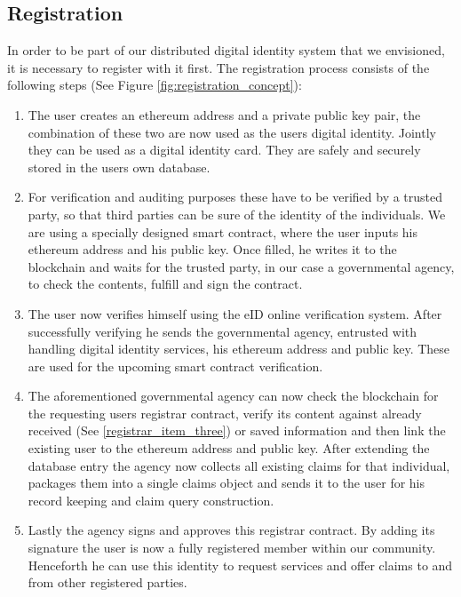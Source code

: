 \subsection{Registration}
In order to be part of our distributed digital identity system that we envisioned, it is necessary to register with it first. The registration process consists of the following steps (See Figure \ref{fig:registration_concept}):

\begin{enumerate}
\item \label{registrar_item_one}
The user creates an ethereum address and a private public key pair, the combination of these two are now used as the users digital identity. Jointly they can be used as a digital identity card. They are safely and securely stored in the users own database.
\item \label{registrar_item_two}
For verification and auditing purposes these have to be verified by a trusted party, so that third parties can be sure of the identity of the individuals. We are using a specially designed smart contract, where the user inputs his ethereum address and his public key. Once filled, he writes it to the blockchain and waits for the trusted party, in our case a governmental agency, to check the contents, fulfill and sign the contract.
\item \label{registrar_item_three}
The user now verifies himself using the eID online verification system. After successfully verifying he sends the governmental agency, entrusted with handling digital identity services, his ethereum address and public key. These are used for the upcoming smart contract verification.
\begin{comment}
DONT NEED: The user can now have his ethereum address and private public key pair verified by a governmental agency.
\end{comment}
\item \label{registrar_item_four}
The aforementioned governmental agency can now check the blockchain for the requesting users registrar contract, verify its content against already received (See \ref{registrar_item_three}) or saved information and then link the existing user to the ethereum address and public key. After extending the database entry the agency now collects all existing claims for that individual, packages them into a single claims object and sends it to the user for his record keeping and claim query construction.  
\item \label{registrar_item_five}
Lastly the agency signs and approves this registrar contract. By adding its signature the user is now a fully registered member within our community. Henceforth he can use this identity to request services and offer claims to and from other registered parties. 
\end{enumerate}

